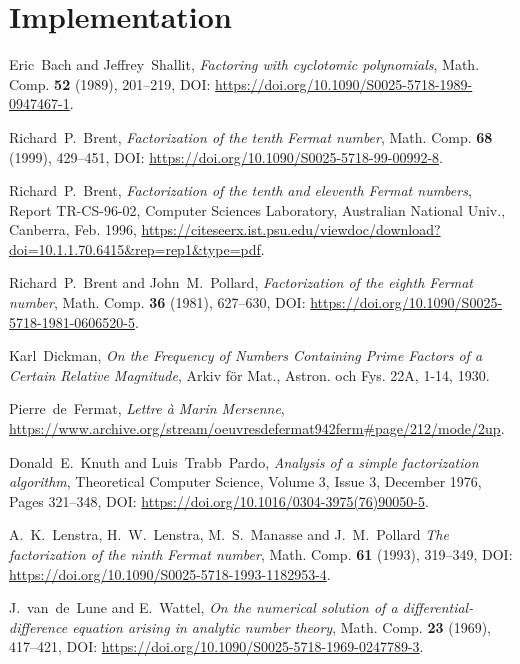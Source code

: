\documentclass[a4paper, 11pt, pdftex]{report}
\theoremstyle{plain}
\theoremstyle{definition}
\begin{document}
%
\chapter{Implementation}

\begin{thebibliography}{99}

 Eric~Bach and Jeffrey~Shallit, \emph{Factoring with cyclotomic polynomials},
Math. Comp. \textbf{52} (1989), 201--219, DOI: \url{https://doi.org/10.1090/S0025-5718-1989-0947467-1}.

 Richard~P.~Brent, \emph{Factorization of the tenth Fermat number}, Math. Comp.
\textbf{68} (1999), 429--451, DOI: \url{https://doi.org/10.1090/S0025-5718-99-00992-8}.

 Richard~P.~Brent, \emph{Factorization of the tenth and eleventh Fermat numbers},
Report TR-CS-96-02, Computer Sciences Laboratory, Australian National Univ., Canberra, Feb. 1996,
\url{https://citeseerx.ist.psu.edu/viewdoc/download?doi=10.1.1.70.6415&rep=rep1&type=pdf}.

 Richard~P.~Brent and John~M.~Pollard, \emph{Factorization of the eighth
Fermat number}, Math. Comp. \textbf{36} (1981), 627--630, DOI:
\url{https://doi.org/10.1090/S0025-5718-1981-0606520-5}.

 Karl~Dickman, \emph{On the Frequency of Numbers Containing Prime Factors
of a Certain Relative Magnitude}, Arkiv för Mat., Astron. och Fys. 22A, 1-14, 1930. 

 Pierre~de~Fermat, \emph{Lettre à Marin Mersenne},
\url{https://www.archive.org/stream/oeuvresdefermat942ferm#page/212/mode/2up}.

 Donald~E.~Knuth and Luis~Trabb~Pardo, \emph{Analysis of a simple
factorization algorithm}, Theoretical Computer Science, Volume 3, Issue 3, December 1976,
Pages 321--348, DOI: \url{https://doi.org/10.1016/0304-3975(76)90050-5}.

 A.~K.~Lenstra, H.~W.~Lenstra, M.~S.~Manasse and J.~M.~Pollard
\emph{The factorization of the ninth Fermat number}, Math. Comp. \textbf{61} (1993), 319--349,
DOI: \url{https://doi.org/10.1090/S0025-5718-1993-1182953-4}.

 J.~van~de~Lune and E.~Wattel, \emph{On the numerical solution of a
differential-difference equation arising in analytic number theory}, Math. Comp. \textbf{23}
(1969), 417--421, DOI: \url{https://doi.org/10.1090/S0025-5718-1969-0247789-3}.


\end{thebibliography}
\end{document}
